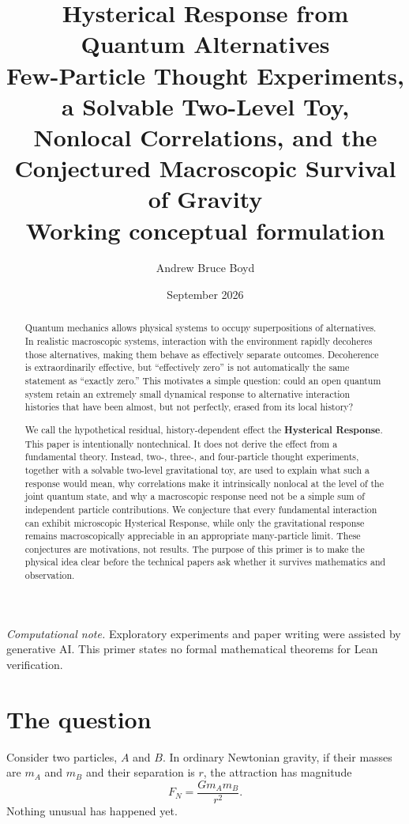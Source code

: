 \documentclass[11pt]{article}
\title{\textbf{Hysterical Response from Quantum Alternatives}\\[0.45em]
\large Few-Particle Thought Experiments, a Solvable Two-Level Toy,\\Nonlocal Correlations, and the Conjectured Macroscopic Survival of Gravity\\[0.9em]
\normalsize Working conceptual formulation}
\author{Andrew Bruce Boyd}
\date{September 2026}
\begin{document}
\maketitle
\noindent\textit{Computational note.}
Exploratory experiments and paper writing were assisted by generative AI.
This primer states no formal mathematical theorems for Lean verification.

\begin{abstract}
Quantum mechanics allows physical systems to occupy superpositions of alternatives. In realistic macroscopic systems, interaction with the environment rapidly decoheres those alternatives, making them behave as effectively separate outcomes. Decoherence is extraordinarily effective, but ``effectively zero'' is not automatically the same statement as ``exactly zero.'' This motivates a simple question: could an open quantum system retain an extremely small dynamical response to alternative interaction histories that have been almost, but not perfectly, erased from its local history?

We call the hypothetical residual, history-dependent effect the \textbf{Hysterical Response}. This paper is intentionally nontechnical. It does not derive the effect from a fundamental theory. Instead, two-, three-, and four-particle thought experiments, together with a solvable two-level gravitational toy, are used to explain what such a response would mean, why correlations make it intrinsically nonlocal at the level of the joint quantum state, and why a macroscopic response need not be a simple sum of independent particle contributions. We conjecture that every fundamental interaction can exhibit microscopic Hysterical Response, while only the gravitational response remains macroscopically appreciable in an appropriate many-particle limit. These conjectures are motivations, not results. The purpose of this primer is to make the physical idea clear before the technical papers ask whether it survives mathematics and observation.
\end{abstract}
\tableofcontents
\newpage

\section{The question}
Consider two particles, $A$ and $B$. In ordinary Newtonian gravity, if their masses are $m_A$ and $m_B$ and their separation is $r$, the attraction has magnitude
\begin{equation}
F_N=\frac{Gm_Am_B}{r^2}.
\end{equation}
Nothing unusual has happened yet.
\end{document}
